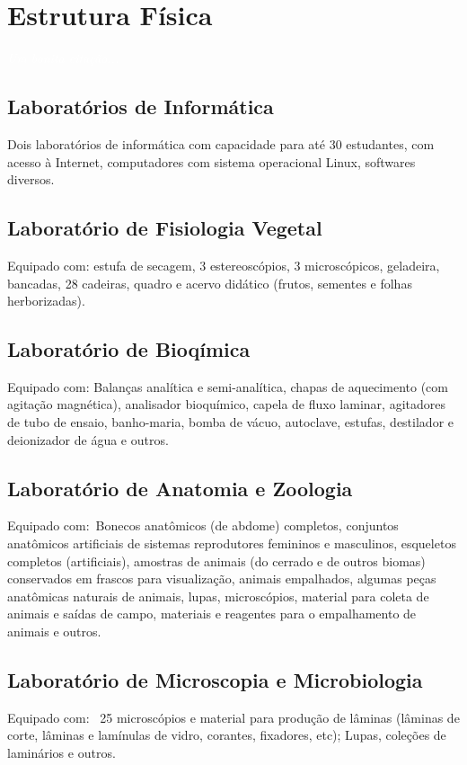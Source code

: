 \documentclass[11pt,fleqn]{book} %
\begin{document}
\chapter{Estrutura Física}\label{estrutura}
\vspace{6em}
\begin{flushright}
	\textit{\textcolor{white}{Um bonita citação...}}
\end{flushright}
\vspace{12em}

\section{Laboratórios de Informática}
Dois laboratórios de informática com capacidade para até 30 estudantes, com acesso à Internet, computadores com sistema operacional Linux, softwares diversos.


\section{Laboratório de Fisiologia Vegetal}
Equipado com: estufa de secagem, 3 estereoscópios, 3 microscópicos, geladeira, bancadas, 28 cadeiras, quadro e acervo didático (frutos, sementes e folhas herborizadas). 

\section{Laboratório de Bioqímica}
Equipado com: Balanças analítica e semi-analítica, chapas de aquecimento (com agitação magnética), analisador bioquímico, capela de fluxo laminar, agitadores de tubo de ensaio, banho-maria, bomba de vácuo, autoclave, estufas, destilador e deionizador de água e outros.

\section{Laboratório de Anatomia e Zoologia}
Equipado com: Bonecos anatômicos (de abdome) completos, conjuntos anatômicos artificiais de sistemas reprodutores femininos e masculinos, esqueletos completos (artificiais), amostras de animais (do cerrado e de outros biomas) conservados em frascos para visualização, animais empalhados, algumas peças anatômicas naturais de animais, lupas, microscópios, material para coleta de animais e saídas de campo, materiais e reagentes para o empalhamento de animais e outros.

\section{Laboratório de Microscopia e Microbiologia}
Equipado com:  25 microscópios e material para produção de lâminas (lâminas de corte, lâminas e lamínulas de vidro, corantes, fixadores, etc); Lupas, coleções de laminários e outros.
\end{document}
